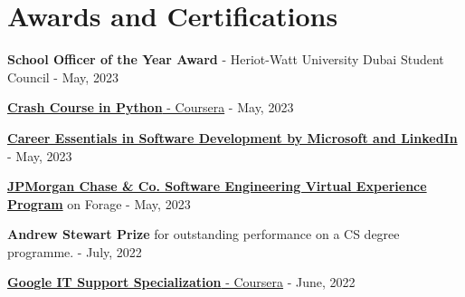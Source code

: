 \documentclass[a4paper,20pt]{article}
\newcommand{\resumeItem}[2] {
	\item\small{
		\textbf{#1}{: #2 \vspace{-2pt}}
	}
}
\newcommand{\resumeSubItem}[2]{\resumeItem{#1}{#2}\vspace{-3pt}}
\newcommand{\resumeSubHeadingListStart}{\begin{itemize}[leftmargin=*]}
\newcommand{\resumeSubHeadingListEnd}{\end{itemize}}
\begin{document}
\section{Awards and Certifications}
\begin{description}[font=$\bullet$]
	\item {\textbf{School Officer of the Year Award} - Heriot-Watt University Dubai Student Council - May, 2023}
	\vspace{-5pt}
	\item {\href{https://coursera.org/verify/ABB3UBEAZ79M}{\textbf{Crash Course in Python} - Coursera} - May, 2023}
	\vspace{-5pt}
	\item {\href{https://www.linkedin.com/learning/certificates/89ecc674e4f0587a88390cc07ce509093d8b63cd8bcb02e3fd833e966bba7ea8}{\textbf{Career Essentials in Software Development by Microsoft and LinkedIn}} - May, 2023}
	\vspace{-5pt}
	\item {\href{https://forage-uploads-prod.s3.amazonaws.com/completion-certificates/J.P.%20Morgan/R5iK7HMxJGBgaSbvk_J.P.%20Morgan_v7jbBRBbdKKPXyREZ_1683882954578_completion_certificate.pdf}{\textbf{JPMorgan Chase \& Co. Software Engineering Virtual Experience Program}} on Forage - May, 2023}
	\vspace{-5pt}
	\item {\textbf{Andrew Stewart Prize} for outstanding performance on a CS degree programme. - July, 2022}
	\vspace{-5pt}
	\item {\href{https://coursera.org/verify/professional-cert/KXSX89ULVN5F}{\textbf{Google IT Support Specialization} - Coursera} - June, 2022}
	\vspace{-5pt}

\end{description}
\end{document}
